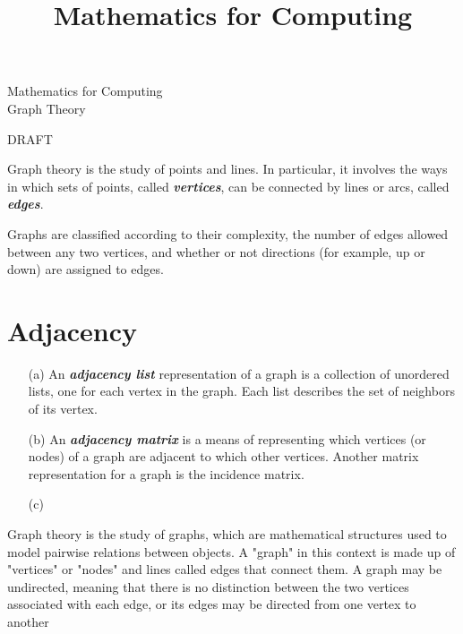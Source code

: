 \documentclass[12pt]{article}
\title{Mathematics for Computing}
\begin{document}
\begin{center}
\huge{Mathematics for Computing}\\
\LARGE{Graph Theory}
\end{center}

DRAFT


Graph theory is the study of points and lines. In particular, it involves the ways in which sets of points, called \textit{\textbf{vertices}}, can be connected by lines or arcs, called \textit{\textbf{edges}}.

Graphs are classified according to their complexity, the number of edges allowed between any two vertices, and whether or not directions (for example, up or down) are assigned to edges. 


\section*{Adjacency}
\begin{itemize}

\item[(a)] An \textit{\textbf{adjacency list}} representation of a graph is a collection of unordered lists, one for each vertex in the graph. Each list describes the set of neighbors of its vertex.

\item[(b)] An \textit{\textbf{adjacency matrix}} is a means of representing which vertices (or nodes) of a graph are adjacent to which other vertices. Another matrix representation for a graph is the incidence matrix.

\item[(c)]

\end{itemize}

Graph theory is the study of graphs, which are mathematical structures used to model pairwise relations between objects. A "graph" in this context is made up of "vertices" or "nodes" and lines called edges that connect them. A graph may be undirected, meaning that there is no distinction between the two vertices associated with each edge, or its edges may be directed from one vertex to another

\newpage
\end{document}
